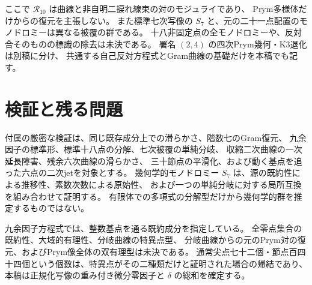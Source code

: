 ここで $\mathcal R_{10}$ は曲線と非自明二捩れ線束の対のモジュライであり、
Prym多様体だけからの復元を主張しない。
また標準七次写像の $S_7$ と、元の二十一点配置のモノドロミーは異なる被覆の群である。
十八非固定点の全モノドロミーや、反対合そのものの標識の除去は未決である。
署名 $(2,4)$ の四次Prym幾何・K3退化は別稿\cite{PaperV}に分け、
共通する自己反対方程式とGram曲線の基礎だけを本稿でも記す。













\section{検証と残る問題}
付属の厳密な検証は、同じ既存成分上での滑らかさ、階数七のGram復元、
九余因子の標準形、標準十八点の分解、七次被覆の単純分岐、
収縮二次曲線の一次延長障害、残余六次曲線の滑らかさ、
三十節点の平滑化、および動く基点を追った六点の二次jetを対象とする。
幾何学的モノドロミー $S_7$ は、源の既約性による推移性、素数次数による原始性、
および一つの単純分岐に対する局所互換を組み合わせて証明する。
有限体での多項式の分解型だけから幾何学的群を推定するものではない。

九余因子方程式では、整数基点を通る既約成分を指定している。
全零点集合の既約性、大域的有理性、分岐曲線の特異点型、
分岐曲線からの元のPrym対の復元、およびPrym像全体の双有理型は未決である。
通常尖点七十二個・節点百四十四個という個数は、特異点がその二種類だけと証明された場合の帰結であり、
本稿は正規化写像の重み付き微分零因子と $\delta$ の総和を確定する。

